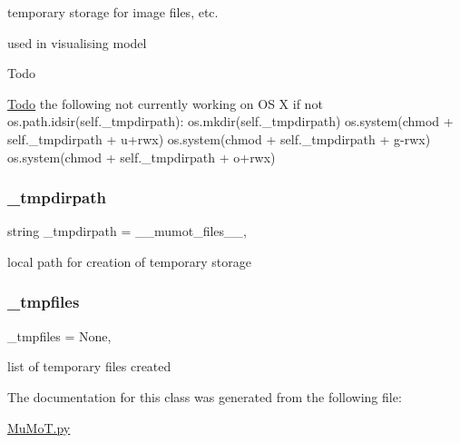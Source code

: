 temporary storage for image files, etc. 

used in visualising model

\begin{DoxyRefDesc}{Todo}
\item[\hyperlink{todo__todo000017}{Todo}]the following not currently working on OS X if not os.\+path.\+idsir(self.\+\_\+tmpdirpath)\+: os.\+mkdir(self.\+\_\+tmpdirpath) os.\+system(\textquotesingle{}chmod\textquotesingle{} + self.\+\_\+tmpdirpath + \textquotesingle{}u+rwx\textquotesingle{}) os.\+system(\textquotesingle{}chmod\textquotesingle{} + self.\+\_\+tmpdirpath + \textquotesingle{}g-\/rwx\textquotesingle{}) os.\+system(\textquotesingle{}chmod\textquotesingle{} + self.\+\_\+tmpdirpath + \textquotesingle{}o+rwx\textquotesingle{}) \end{DoxyRefDesc}
\mbox{\label{class_mu_mo_t_1_1_mu_mo_tmodel_a4ac4f3325e967c92d03e2c4e023a0d5d}} 
\subsubsection{\texorpdfstring{\+\_\+tmpdirpath}{\_tmpdirpath}}
{\footnotesize\ttfamily string \+\_\+tmpdirpath = \textquotesingle{}\+\_\+\+\_\+mumot\+\_\+files\+\_\+\+\_\+\textquotesingle{}\hspace{0.3cm}{\ttfamily [static]}, {\ttfamily [private]}}



local path for creation of temporary storage 

\mbox{\label{class_mu_mo_t_1_1_mu_mo_tmodel_a3f2d20ce626e9e6cdc4a4662727121e6}} 
\subsubsection{\texorpdfstring{\+\_\+tmpfiles}{\_tmpfiles}}
{\footnotesize\ttfamily \+\_\+tmpfiles = None\hspace{0.3cm}{\ttfamily [static]}, {\ttfamily [private]}}



list of temporary files created 



The documentation for this class was generated from the following file\+:\begin{DoxyCompactItemize}
\item 
\hyperlink{_mu_mo_t_8py}{Mu\+Mo\+T.\+py}\end{DoxyCompactItemize}

